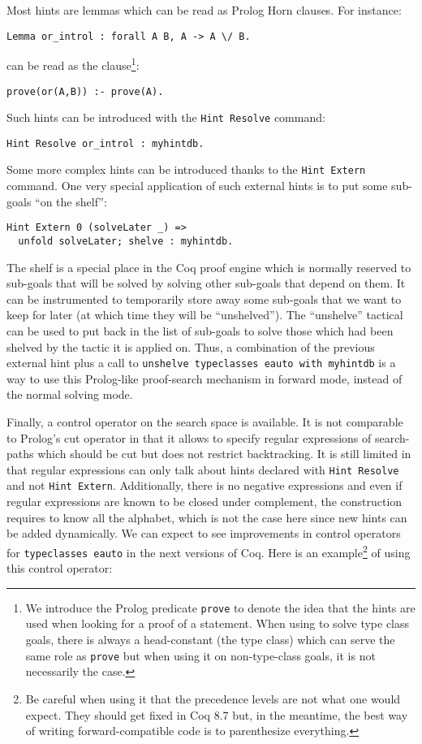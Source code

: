 \documentclass[nocopyrightspace,blockstyle,numbers]{sigplanconf}
\begin{document}
Most hints are lemmas which can be read as Prolog Horn clauses.
For instance:

\begin{verbatim}
Lemma or_introl : forall A B, A -> A \/ B.
\end{verbatim}
can be read as the clause\footnote{We introduce the Prolog predicate
  \texttt{prove} to denote the idea that the hints are used when looking
  for a proof of a statement. When using  to
  solve type class goals, there is always a head-constant (the type class)
  which can serve the same role as \texttt{prove} but when using it on
  non-type-class goals, it is not necessarily the case.}:

\begin{verbatim}
prove(or(A,B)) :- prove(A).
\end{verbatim}
Such hints can be introduced with the \texttt{Hint Resolve} command:

\begin{verbatim}
Hint Resolve or_introl : myhintdb.
\end{verbatim}

Some more complex hints can be introduced thanks to the
\texttt{Hint Extern} command. One very special application of
such external hints is to put some sub-goals ``on the shelf'':

\begin{verbatim}
Hint Extern 0 (solveLater _) =>
  unfold solveLater; shelve : myhintdb.
\end{verbatim}

The shelf is a special place in the Coq proof engine which is
normally reserved to sub-goals that will be solved by solving other
sub-goals that depend on them. It can be instrumented to temporarily
store away some sub-goals that we want to keep for later (at which
time they will be ``unshelved'').
The ``unshelve'' tactical can be used to put back in the list of
sub-goals to solve those which had been shelved by the tactic it is
applied on.
Thus, a combination of the previous external hint plus a call to
\texttt{unshelve typeclasses eauto with myhintdb} is a way to use
this Prolog-like proof-search mechanism in forward mode, instead of
the normal solving mode.

Finally, a control operator on the search space is available. It is
not comparable to Prolog's cut operator in that it allows to specify
regular expressions of search-paths which should be cut but does
not restrict backtracking. It is still
limited in that regular expressions can only talk about hints
declared with \texttt{Hint Resolve} and not \texttt{Hint Extern}.
Additionally, there is no negative expressions and even if regular
expressions are known to be closed under complement, the construction
requires to know all the alphabet, which is not the case here since
new hints can be added dynamically. We can expect to see improvements
in control operators for \texttt{typeclasses eauto} in the next versions
of Coq. Here is an example\footnote{Be careful when using it that the
precedence levels are not what one would expect. They should get fixed
in Coq 8.7 but, in the meantime, the best way of writing
forward-compatible code is to parenthesize everything.}
of using this control operator:
\end{document}
